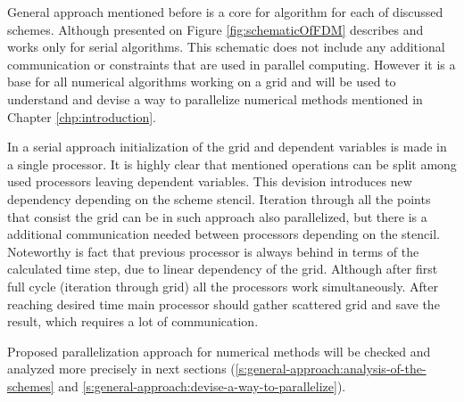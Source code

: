 	General approach mentioned before is a core for algorithm for each of discussed schemes. Although presented on Figure \ref{fig:schematicOfFDM} describes and works only for serial algorithms. This schematic does not include any additional communication or constraints that are used in parallel computing. However it is a base for all numerical algorithms working on a grid and will be used to understand and devise a way to parallelize numerical methods mentioned in Chapter \ref{chp:introduction}.
	
	In a serial approach initialization of the grid and dependent variables is made in a single processor. It is highly clear that mentioned operations can be split among used processors leaving dependent variables. This devision introduces new dependency depending on the scheme \gls{stencil}. Iteration through all the points that consist the grid can be in such approach also parallelized, but there is a additional communication needed between processors depending on the \gls{stencil}. Noteworthy is fact that previous processor is always behind in terms of the calculated time step, due to linear dependency of the grid. Although after first full cycle (iteration through grid) all the processors work simultaneously. After reaching desired time main processor should gather scattered grid and save the result, which requires a lot of communication.
	
	Proposed parallelization approach for numerical methods will be checked and analyzed more precisely in next sections (\ref{s:general-approach:analysis-of-the-schemes} and \ref{s:general-approach:devise-a-way-to-parallelize}).
	
	




